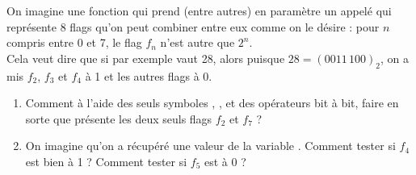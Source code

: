 \documentclass[a4paper,12pt,french]{book}
\begin{document}
\begin{exercice}[]
	On imagine une fonction qui prend (entre autres) en paramètre un  appelé  qui représente 8 flags qu'on peut combiner entre eux comme on le désire :
	pour $n$ compris entre 0 et 7, le flag $f_n$ n'est autre que $2^n$.\\
	Cela veut dire que si par exemple  vaut 28, alors puisque $28=(0011\,100)_2$, on a mis $f_2$, $f_3$ et $f_4$ à 1 et les autres flags à 0.
	\begin{enumerate}[\bfseries 1.]
		\item 	Comment à l'aide des seuls symboles , ,  et des opérateurs bit à bit, faire en sorte que  présente les deux seuls flags $f_2$ et $f_7$ ?
		\item 	On imagine qu'on a récupéré une valeur de la variable . Comment tester si $f_4$ est bien à 1 ? Comment tester si $f_5$ est à 0 ?
	\end{enumerate}
\end{exercice}
\end{document}

